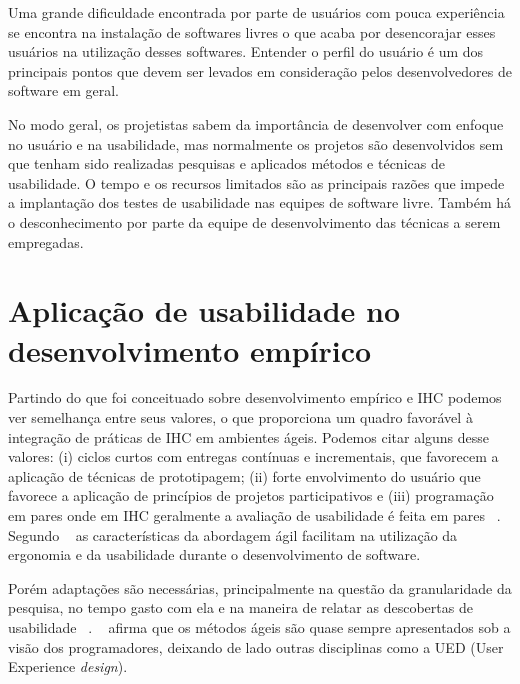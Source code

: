 Uma grande dificuldade encontrada por parte de usuários com pouca experiência se encontra na instalação de softwares livres o que acaba por desencorajar esses usuários na utilização desses softwares. Entender o perfil do usuário é um dos principais pontos que devem ser levados em consideração pelos desenvolvedores de software em geral. 

No modo geral, os projetistas sabem da importância de desenvolver com enfoque no usuário e na usabilidade, mas normalmente os projetos são desenvolvidos sem que tenham sido realizadas pesquisas e aplicados métodos e técnicas de usabilidade.
%	
O tempo e os recursos limitados são as principais razões que impede a implantação dos testes de usabilidade nas equipes de software livre. Também há o desconhecimento por parte da equipe de desenvolvimento das técnicas a serem empregadas.
%
\section{Aplicação de usabilidade no desenvolvimento empírico}

	Partindo do que foi conceituado sobre desenvolvimento empírico e IHC podemos ver semelhança entre seus valores, o que proporciona um quadro favorável à integração de práticas de IHC em ambientes ágeis. Podemos citar alguns desse valores: (i) ciclos curtos com entregas contínuas e incrementais, que favorecem a aplicação de técnicas de prototipagem; (ii) forte envolvimento do usuário que favorece a aplicação de princípios de projetos participativos e (iii) programação em pares onde em IHC geralmente a avaliação de usabilidade é feita em pares ~\cite{barbosa2008estrategia}. 
	Segundo ~ as características da abordagem ágil facilitam na utilização da ergonomia e da usabilidade durante o desenvolvimento de software.
		
	Porém adaptações são necessárias, principalmente na questão da granularidade da pesquisa, no tempo gasto com ela e na maneira de relatar as descobertas de usabilidade ~\cite{santos2012}.
	~ afirma que os métodos ágeis são quase sempre apresentados sob a visão dos programadores, deixando de lado outras disciplinas como a UED (User Experience \emph{design}). 

